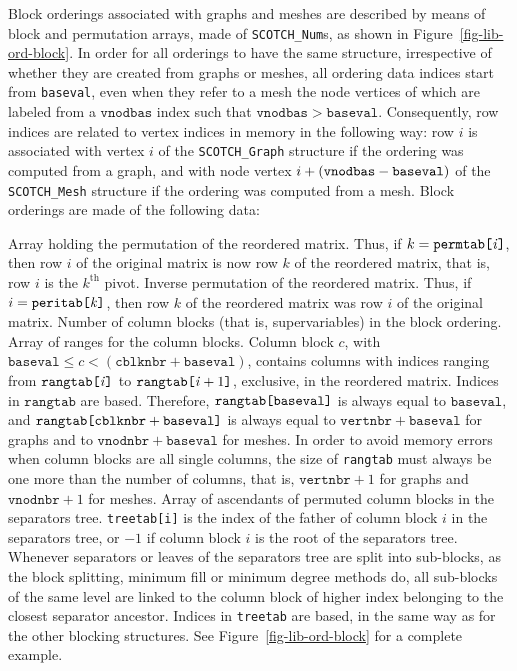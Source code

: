 Block orderings associated with graphs and meshes are described by
means of block and permutation arrays, made of {\tt SCOTCH\_Num}s, as
shown in Figure~\ref{fig-lib-ord-block}. In order for all orderings to
have the same structure, irrespective of whether they are created from
graphs or meshes, all ordering data indices start from {\tt baseval},
even when they refer to a mesh the node vertices of which are labeled
from a $\mathtt{vnodbas}$ index such that $\mathtt{vnodbas} >
\mathtt{baseval}$. Consequently, row indices are related to vertex
indices in memory in the following way: row $i$ is associated with
vertex $i$ of the {\tt SCOTCH\_\lbt Graph} structure if the ordering
was computed from a graph, and with node vertex $i + (\mbox{\tt
vnodbas} - \mathtt{baseval})$ of the {\tt SCOTCH\_\lbt Mesh}
structure if the ordering was computed from a mesh.
Block orderings are made of the following data:
\begin{itemize}
\iteme[{\tt permtab}]
Array holding the permutation of the reordered matrix. Thus, if $k =
\mathtt{permtab}\mbox{\tt [}\mathit{i}\mbox{\tt ]}$, then row $i$ of
the original matrix is now row $k$ of the reordered matrix, that is,
row $i$ is the $k^{\mathrm{th}}$ pivot.
\iteme[{\tt peritab}]
Inverse permutation of the reordered matrix. Thus, if
$i = \mathtt{peritab}\mbox{\tt [}\mathit{k}\mbox{\tt ]}$, then row $k$
of the reordered matrix was row $i$ of the original matrix.
\iteme[{\tt cblknbr}]
Number of column blocks (that is, supervariables) in the block ordering.
\iteme[{\tt rangtab}]
Array of ranges for the column blocks. Column block $c$, with
$\mathtt{baseval} \leq c < (\mathtt{cblknbr} + \mathtt{baseval})$,
contains columns with indices ranging from
$\mathtt{rangtab}\mbox{\tt [}\mathit{i}\mbox{\tt ]}$ to
$\mathtt{rangtab}\mbox{\tt [}\mathit{i} + 1\mbox{\tt ]}$, exclusive,
in the reordered matrix. Indices in $\mathtt{rangtab}$ are
based. Therefore,
$\mathtt{rangtab}\mbox{\tt [}\mathtt{baseval}\mbox{\tt ]}$ is always
equal to $\mathtt{baseval}$, and
$\mathtt{rangtab}\mbox{\tt [}\mathtt{cblknbr} +
\mathtt{baseval}\mbox{\tt ]}$ is always equal to
$\mathtt{vertnbr} + \mathtt{baseval}$ for graphs and
to $\mathtt{vnodnbr} + \mathtt{baseval}$ for meshes.
In order to avoid memory errors when column blocks are all single
columns, the size of {\tt rangtab} must always be one more than the
number of columns, that is, $\mathtt{vertnbr} + 1$ for graphs and
$\mathtt{vnodnbr} + 1$ for meshes.
\iteme[{\tt treetab}]
Array of ascendants of permuted column blocks in the separators tree.
{\tt treetab[i]} is the index of the father of column block $i$ in the
separators tree, or $-1$ if column block $i$ is the root of the
separators tree. Whenever separators or leaves of the separators tree
are split into sub-blocks, as the block splitting, minimum fill or minimum
degree methods do, all sub-blocks of the same level are linked to the
column block of higher index belonging to the closest separator
ancestor. Indices in {\tt treetab} are based, in the same way as for
the other blocking structures. See Figure~\ref{fig-lib-ord-block} for
a complete example.
\end{itemize}


